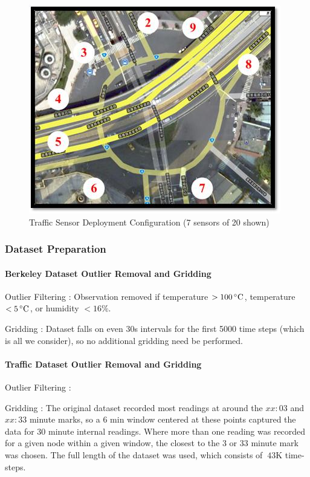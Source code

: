 \begin{figure}[H]
\centering
\includegraphics[scale=0.5]{traffic_wsn.png}
\caption{Traffic Sensor Deployment Configuration (7 sensors of 20 shown)}
\end{figure}

\subsubsection{Dataset Preparation}

\paragraph*{Berkeley Dataset Outlier Removal and Gridding}

Outlier Filtering : Observation removed if temperature $> 100\,^{\circ}\mathrm{C}$, temperature $< 5\,^{\circ}\mathrm{C}$, or humidity $< 16\%$.

Gridding : Dataset falls on even 30s intervals for the first 5000 time steps (which is all we consider), so no additional gridding need be performed.

\paragraph*{Traffic Dataset Outlier Removal and Gridding}

Outlier Filtering : 

Gridding : The original dataset recorded most readings at around the $xx:03$ and $xx:33$ minute marks, so a $6$ min window centered at
these points captured the data for $30$ minute internal readings.
Where more than one reading was recorded for a given node within a given window, the closest to the $3$ or $33$ minute mark was chosen.
The full length of the dataset was used, which consists of $~43$K time-steps.

